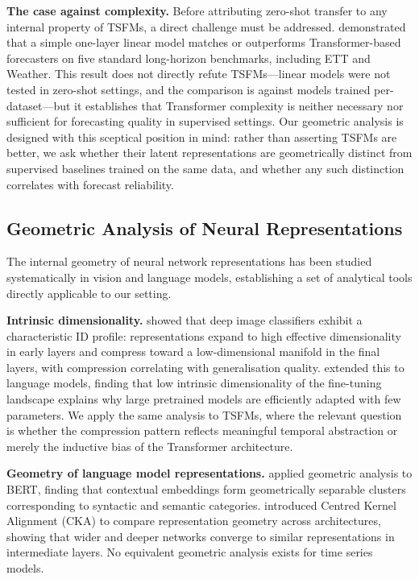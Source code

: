 \textbf{The case against complexity.}
Before attributing zero-shot transfer to any internal property of TSFMs,
a direct challenge must be addressed.
\citet{zeng2023transformers} demonstrated that a simple one-layer linear model
matches or outperforms Transformer-based forecasters on five standard long-horizon
benchmarks, including ETT and Weather.
This result does not directly refute TSFMs---linear models were not tested in
zero-shot settings, and the comparison is against models trained per-dataset---but
it establishes that Transformer complexity is neither necessary nor sufficient for
forecasting quality in supervised settings.
Our geometric analysis is designed with this sceptical position in mind:
rather than asserting TSFMs are better, we ask whether their latent representations
are geometrically distinct from supervised baselines trained on the same data,
and whether any such distinction correlates with forecast reliability.

\subsection{Geometric Analysis of Neural Representations}
\label{sec:bg_geometry}

The internal geometry of neural network representations has been studied
systematically in vision and language models, establishing a set of
analytical tools directly applicable to our setting.

\textbf{Intrinsic dimensionality.}
\citet{ansuini2019intrinsic} showed that deep image classifiers exhibit a
characteristic ID profile: representations expand to high effective
dimensionality in early layers and compress toward a low-dimensional manifold
in the final layers, with compression correlating with generalisation quality.
\citet{birdal2021intrinsic} extended this to language models, finding that
low intrinsic dimensionality of the fine-tuning landscape explains why
large pretrained models are efficiently adapted with few parameters.
We apply the same analysis to TSFMs, where the relevant question is whether
the compression pattern reflects meaningful temporal abstraction or merely
the inductive bias of the Transformer architecture.

\textbf{Geometry of language model representations.}
\citet{reif2019visualizing} applied geometric analysis to BERT, finding that
contextual embeddings form geometrically separable clusters corresponding to
syntactic and semantic categories.
\citet{kornblith2019similarity} introduced Centred Kernel Alignment (CKA) to
compare representation geometry across architectures, showing that wider and
deeper networks converge to similar representations in intermediate layers.
No equivalent geometric analysis exists for time series models.

